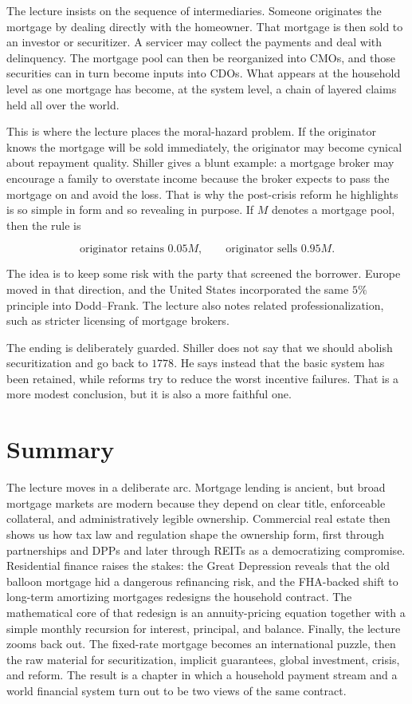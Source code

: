 The lecture insists on the sequence of intermediaries. Someone originates the mortgage by dealing directly with the homeowner. That mortgage is then sold to an investor or securitizer. A servicer may collect the payments and deal with delinquency. The mortgage pool can then be reorganized into CMOs, and those securities can in turn become inputs into CDOs. What appears at the household level as one mortgage has become, at the system level, a chain of layered claims held all over the world.

This is where the lecture places the moral-hazard problem. If the originator knows the mortgage will be sold immediately, the originator may become cynical about repayment quality. Shiller gives a blunt example: a mortgage broker may encourage a family to overstate income because the broker expects to pass the mortgage on and avoid the loss. That is why the post-crisis reform he highlights is so simple in form and so revealing in purpose. If \(M\) denotes a mortgage pool, then the rule is

\begin{equation}
\text{originator retains } 0.05M,
\qquad
\text{originator sells } 0.95M.
\end{equation}

The idea is to keep some risk with the party that screened the borrower. Europe moved in that direction, and the United States incorporated the same \(5\%\) principle into Dodd--Frank. The lecture also notes related professionalization, such as stricter licensing of mortgage brokers.

The ending is deliberately guarded. Shiller does not say that we should abolish securitization and go back to \(1778\). He says instead that the basic system has been retained, while reforms try to reduce the worst incentive failures. That is a more modest conclusion, but it is also a more faithful one.

\section{Summary}

The lecture moves in a deliberate arc. Mortgage lending is ancient, but broad mortgage markets are modern because they depend on clear title, enforceable collateral, and administratively legible ownership. Commercial real estate then shows us how tax law and regulation shape the ownership form, first through partnerships and DPPs and later through REITs as a democratizing compromise. Residential finance raises the stakes: the Great Depression reveals that the old balloon mortgage hid a dangerous refinancing risk, and the FHA-backed shift to long-term amortizing mortgages redesigns the household contract. The mathematical core of that redesign is an annuity-pricing equation together with a simple monthly recursion for interest, principal, and balance. Finally, the lecture zooms back out. The fixed-rate mortgage becomes an international puzzle, then the raw material for securitization, implicit guarantees, global investment, crisis, and reform. The result is a chapter in which a household payment stream and a world financial system turn out to be two views of the same contract.
